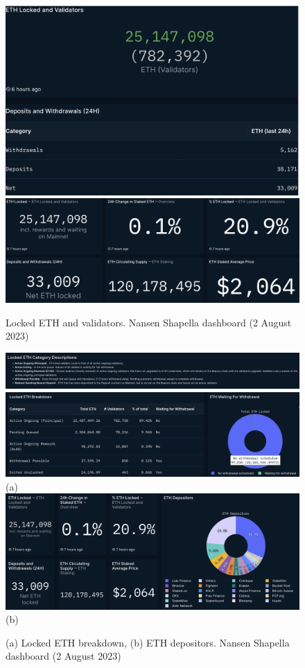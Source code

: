 \documentclass[UTF8]{article}
\begin{document}
\begin{figure}[htbp]
\begin{center}
\includegraphics[width=0.45\linewidth]{images/nansen2}
\includegraphics[width=0.45\linewidth]{images/nansen6}
\caption{Locked ETH and validators. Nansen Shapella dashboard (2 August 2023)}
\label{fig:nansen2}
\end{center}
\end{figure}

\begin{figure}[htbp]
\begin{center}
\includegraphics[width=\linewidth]{images/nansen3a} \\
\includegraphics[width=\linewidth]{images/nansen8}\\
(a)\\
\includegraphics[width=\linewidth]{images/nansen5}\\
(b)
\caption{(a) Locked ETH breakdown, (b) ETH depositors. Nansen Shapella dashboard (2 August 2023)}
\label{fig:nansen3}
\end{center}
\end{figure}
\end{document}

